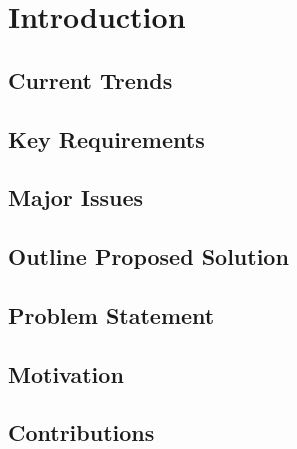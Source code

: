 \section{Introduction}

\subsection{Current Trends}

\subsection{Key Requirements}

\subsection{Major Issues}

\subsection{Outline Proposed Solution}

\subsection{Problem Statement}

\subsection{Motivation}

\subsection{Contributions}